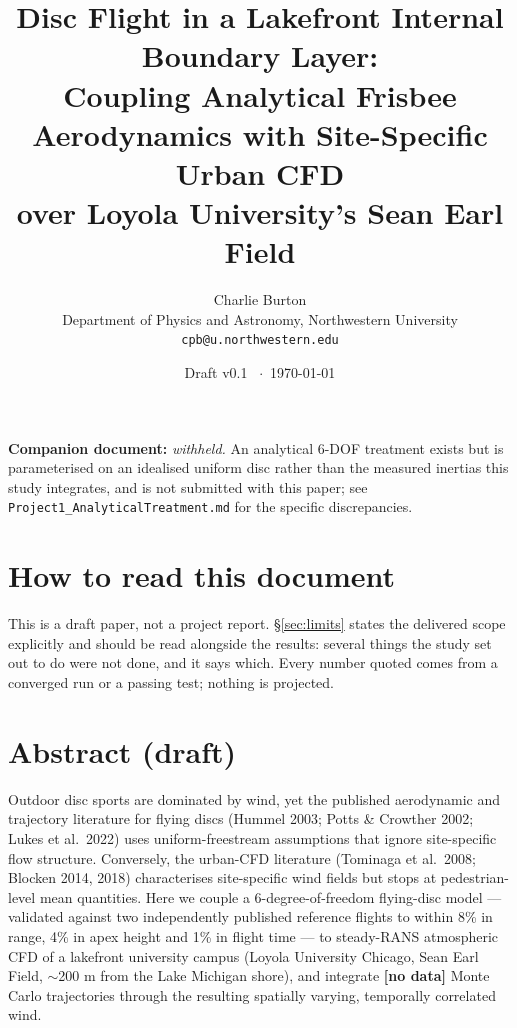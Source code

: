 \documentclass[11pt,letterpaper]{article}
\title{\bfseries Disc Flight in a Lakefront Internal Boundary Layer:\\Coupling Analytical Frisbee Aerodynamics with Site-Specific Urban CFD\\over Loyola University's Sean Earl Field}
\author{Charlie Burton\\
  \small Department of Physics and Astronomy, Northwestern University\\
  \small \texttt{cpb@u.northwestern.edu}}
\date{Draft v0.1 \ $\cdot$\ \today}
\newcommand{\MISSINGNUM}{\textbf{\color{red}[no data]}}%
\newcommand{\NtotalThrows}{\MISSINGNUM}\newcommand{\NthrowsPerCell}{\MISSINGNUM}%
\begin{document}
\maketitle

\noindent\textbf{Companion document:} \emph{withheld.} An analytical 6-DOF treatment exists
but is parameterised on an idealised uniform disc rather than the measured inertias this
study integrates, and is not submitted with this paper; see
\texttt{Project1\_AnalyticalTreatment.md} for the specific discrepancies.

\section*{How to read this document}

This is a draft paper, not a project report. \S\ref{sec:limits} states the delivered scope
explicitly and should be read alongside the results: several things the study set out to do
were not done, and it says which. Every number quoted comes from a converged run or a
passing test; nothing is projected.

\section{Abstract (draft)}
\label{sec:abstract}

Outdoor disc sports are dominated by wind, yet the published aerodynamic and
trajectory literature for flying discs (Hummel 2003; Potts \& Crowther 2002;
Lukes et al.\ 2022) uses uniform-freestream assumptions that ignore
site-specific flow structure. Conversely, the urban-CFD literature (Tominaga et
al.\ 2008; Blocken 2014, 2018) characterises site-specific wind fields but stops
at pedestrian-level mean quantities. Here we couple a 6-degree-of-freedom
flying-disc model --- validated against two independently published reference
flights to within 8\% in range, 4\% in apex height and 1\% in flight time --- to
steady-RANS atmospheric CFD of a lakefront university campus (Loyola University
Chicago, Sean Earl Field, $\sim$200 m from the Lake Michigan shore), and
integrate \NtotalThrows{} Monte Carlo trajectories through the resulting
spatially varying, temporally correlated wind.
\end{document}
